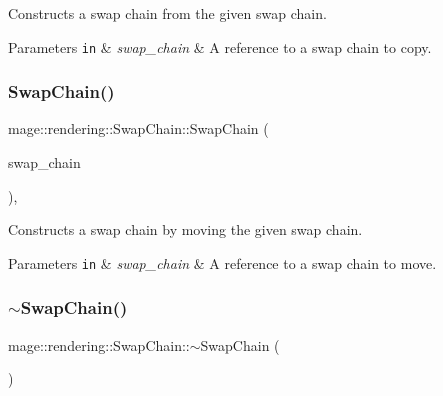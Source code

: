 Constructs a swap chain from the given swap chain.


\begin{DoxyParams}[1]{Parameters}
\mbox{\tt in}  & {\em swap\+\_\+chain} & A reference to a swap chain to copy. \\
\hline
\end{DoxyParams}
\hypertarget{classmage_1_1rendering_1_1_swap_chain_ae6bc03d3e49c012ff4eab712cb97e248}{}\label{classmage_1_1rendering_1_1_swap_chain_ae6bc03d3e49c012ff4eab712cb97e248} 
\subsubsection{\texorpdfstring{Swap\+Chain()}{SwapChain()}\hspace{0.1cm}{\footnotesize\ttfamily [3/3]}}
{\footnotesize\ttfamily mage\+::rendering\+::\+Swap\+Chain\+::\+Swap\+Chain (\begin{DoxyParamCaption}\item[{\hyperlink{classmage_1_1rendering_1_1_swap_chain}{Swap\+Chain} \&\&}]{swap\+\_\+chain }\end{DoxyParamCaption})\hspace{0.3cm}{\ttfamily [default]}, {\ttfamily [noexcept]}}

Constructs a swap chain by moving the given swap chain.


\begin{DoxyParams}[1]{Parameters}
\mbox{\tt in}  & {\em swap\+\_\+chain} & A reference to a swap chain to move. \\
\hline
\end{DoxyParams}
\hypertarget{classmage_1_1rendering_1_1_swap_chain_ae554cc85a11c0126c645263e8ffb1cf4}{}\label{classmage_1_1rendering_1_1_swap_chain_ae554cc85a11c0126c645263e8ffb1cf4} 
\subsubsection{\texorpdfstring{$\sim$\+Swap\+Chain()}{~SwapChain()}}
{\footnotesize\ttfamily mage\+::rendering\+::\+Swap\+Chain\+::$\sim$\+Swap\+Chain (\begin{DoxyParamCaption}{ }\end{DoxyParamCaption})\hspace{0.3cm}{\ttfamily [default]}}


